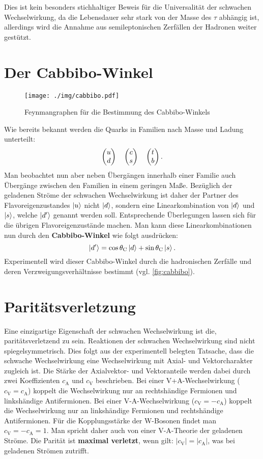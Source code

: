 Dies ist kein besonders stichhaltiger Beweis für die Universalität der schwachen Wechselwirkung, da die Lebensdauer sehr stark von der Masse des $\tau$ abhängig ist,
allerdings wird die Annahme aus semileptonischen Zerfällen der Hadronen weiter gestützt.

\section{Der Cabbibo-Winkel}
\begin{figure}
	\centering
	\texttt{[image: ./img/cabbibo.pdf]}
	\caption{Feynmangraphen für die Bestimmung des Cabbibo-Winkels}
	\label{fig:cabbibo}
\end{figure}

Wie bereits bekannt werden die Quarks in Familien nach Masse und Ladung unterteilt:
\begin{equation*}
	\begin{pmatrix} u \\ d \end{pmatrix}\quad\begin{pmatrix} c \\ s \end{pmatrix}\quad\begin{pmatrix} t \\ b \end{pmatrix}.
\end{equation*}
Man beobachtet nun aber neben Übergängen innerhalb einer Familie auch Übergänge zwischen den Familien in einem geringen Maße.
Bezüglich der geladenen Ströme der schwachen Wechselwirkung ist daher der Partner des Flavoreigenzustandes $\ket{u}$ nicht $\ket{d}$, sondern eine Linearkombination von $\ket{d}$ und $\ket{s}$, welche $\ket{d'}$ genannt werden soll.
Entsprechende Überlegungen lassen sich für die übrigen Flavoreigenzustände machen.
Man kann diese Linearkombinationen nun durch den \textbf{Cabbibo-Winkel} wie folgt ausdrücken:
\begin{equation*}
	\ket{d'} = \cos\theta_\text{C}\ket{d} + \sin\theta_\text{C}\ket{s}.
\end{equation*}
Experimentell wird dieser Cabbibo-Winkel durch die hadronischen Zerfälle und deren Verzweigungsverhältnisse bestimmt (vgl. \autoref{fig:cabbibo}).

\section{Paritätsverletzung}
Eine einzigartige Eigenschaft der schwachen Wechselwirkung ist die, paritätsverletzend zu sein.
Reaktionen der schwachen Wechselwirkung sind nicht spiegelsymmetrisch.
Dies folgt aus der experimentell belegten Tatsache, dass die schwache Wechselwirkung eine Wechselwirkung mit Axial- und Vektorcharakter zugleich ist.
Die Stärke der Axialvektor- und Vektoranteile werden dabei durch zwei Koeffizienten $c_\text{A}$ und $c_\text{V}$ beschrieben.
Bei einer V+A-Wechselwirkung ($c_\text{V}=c_\text{A}$) koppelt die Wechselwirkung nur an rechtshändige Fermionen und linkshändige Antifermionen.
Bei einer V-A-Wechselwirkung ($c_\text{V}=-c_\text{A}$) koppelt die Wechselwirkung nur an linkshändige Fermionen und rechtshändige Antifermionen.
Für die Kopplungsstärke der W-Bosonen findet man $c_\text{V}=-c_\text{A}=1$.
Man spricht daher auch von einer V-A-Theorie der geladenen Ströme.
Die Parität ist \textbf{maximal verletzt}, wenn gilt: $|c_\text{V}|=|c_\text{A}|$, was bei geladenen Strömen zutrifft.

